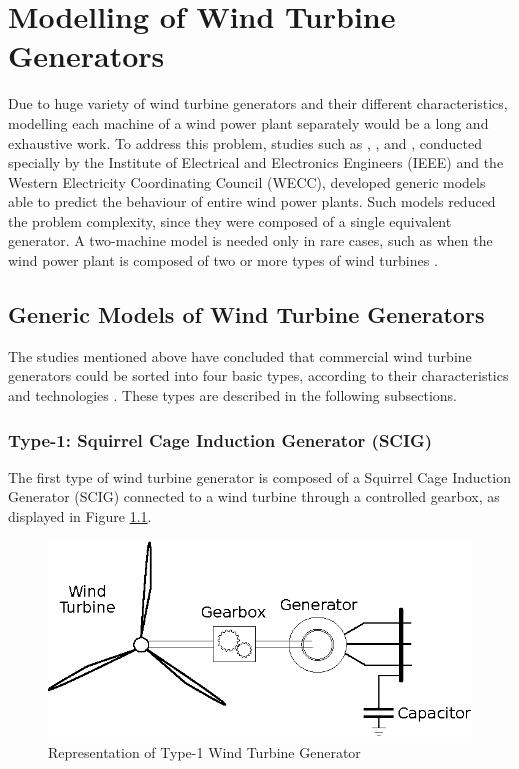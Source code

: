 \chapter{Modelling of Wind Turbine Generators}

\label{ch: Mod}

Due to huge variety of wind turbine generators and their different characteristics, modelling each machine of a wind power plant separately would be a long and exhaustive work. To address this problem, studies such as \cite{Muljadi2008}, \cite{Ellis2011}, \cite{council2008wecc} and \cite{Asmine2011}, conducted specially by the Institute of Electrical and Electronics Engineers (IEEE) and the Western Electricity Coordinating Council (WECC), developed generic models able to predict the behaviour of entire wind power plants. Such models reduced the problem complexity, since they were composed of a single equivalent generator. A two-machine model is needed only in rare cases, such as when the wind power plant is composed of two or more types of wind turbines \cite{Ellis2011}.

\section{Generic Models of Wind Turbine Generators}

The studies mentioned above have concluded that commercial wind turbine generators could be sorted into four basic types, according to their characteristics and technologies \cite{Ellis2011}. These types are described in the following subsections.

\subsection{Type-1: Squirrel Cage Induction Generator (SCIG)}

The first type of wind turbine generator is composed of a Squirrel Cage Induction Generator (SCIG) connected to a wind turbine through a controlled gearbox, as displayed in Figure \ref{fig: WTG1}.

\begin{figure}[h]
	\caption{Representation of Type-1 Wind Turbine Generator}
	\begin{center}
		\includegraphics[scale=.8]{Images/Type1WTG.eps}
	\end{center}
	\label{fig: WTG1}
\end{figure}

